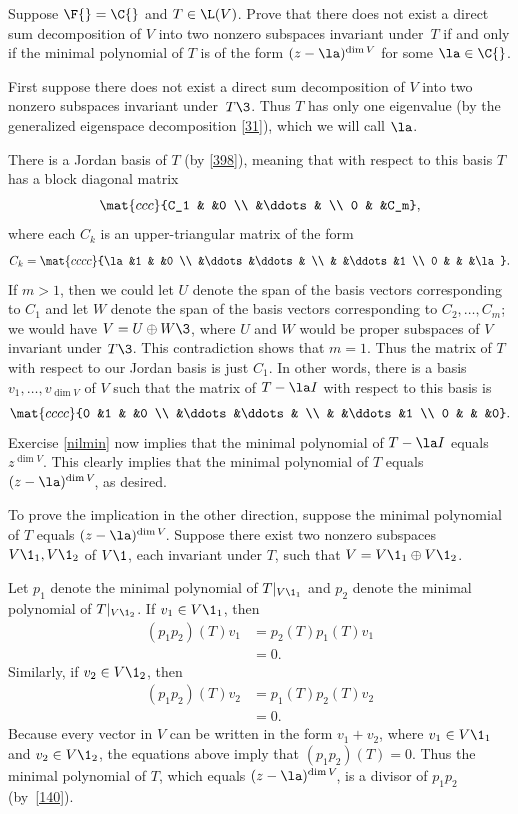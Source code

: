 \exercise
Suppose $\F{} = \C{}$ and $T \in \L(V)$.  Prove that there
does not exist a direct sum decomposition of $V$ into two nonzero subspaces
invariant under~$T$ if and only if the minimal polynomial of $T$ is of the form
$(z - \la)^{\dim V}$ for some $\la \in \C{}$.

\begin{Solution}
First suppose there does not exist a direct sum decomposition of $V$ into
two nonzero subspaces invariant under~$T\3$.  Thus $T$ has only one eigenvalue
(by the generalized eigenspace decomposition \ref{31}), which we will call $\la$.

There is a Jordan basis of $T$ (by \ref{398}), meaning that with respect to this
basis $T$ has a block diagonal matrix
\[
\mat{ccc}{C_1 & &0 \\ &\ddots & \\ 0 & &C_m},
\]
where each\/ $C_k$ is an upper-triangular matrix of the form
\[
C_k = \mat{cccc}{\la &1 & &0 \\
&\ddots &\ddots & \\
& &\ddots &1 \\
0 & & &\la}.
\]
If $m > 1$, then we could let $U$ denote the span of the basis vectors
corresponding to $C_1$ and let $W$ denote the span of the basis vectors
corresponding to $C_2, \dots, C_m$; we would have $V = U \oplus W\3$, where $U$
and $W$ would be proper subspaces of $V$ invariant under $T\3$.  This contradiction
shows that $m = 1$.  Thus the matrix of $T$ with respect to our Jordan basis is
just $C_1$.  In other words, there is a basis $v_1, \dots, v_{\dim V}$ of $V$ such
that the matrix of $T - \la I$ with respect to this basis is
\[
\mat{cccc}{0 &1 & &0 \\
&\ddots &\ddots & \\
& &\ddots &1 \\
0 & & &0}.
\]
Exercise \ref{nilmin} now implies that the minimal polynomial of $T - \la I$ equals
$z^{\dim V}\!$.  This clearly implies that the minimal polynomial of $T$ equals
$(z - \la)^{\dim V}\!$, as desired.

To prove the implication in the other direction, suppose the minimal
polynomial of $T$ equals $(z - \la)^{\dim V}\!$.  Suppose there exist two nonzero subspaces $V\1_1, V\1_2$ of $V\1$, each invariant under $T$,
such that $V = V\1_1 \oplus V\1_2$.

Let $p_1$ denote the minimal polynomial of $T|_{V\1_1}$
and $p_2$ denote the minimal polynomial of $T|_{V\1_2}$.  If $v_1 \in V\1_1$, then
\begin{align*}
(p_1 p_2)(T)v_1 &= p_2(T)p_1(T) v_1 \\
&= 0.
\end{align*}
Similarly, if $v_2 \in V\1_2$, then
\begin{align*}
(p_1 p_2)(T)v_2 &= p_1(T)p_2(T) v_2 \\
&= 0.
\end{align*}
Because every vector in $V$ can be written in the form $v_1 + v_2$, where
$v_1 \in V\1_1$ and $v_2 \in V\1_2$, the equations above imply that $(p_1 p_2)(T) =
0$.  Thus the minimal polynomial of $T$, which equals $(z - \la)^{\dim V}\!$,
is a divisor of $p_1 p_2$ (by~\ref{140}).


\end{Solution}
